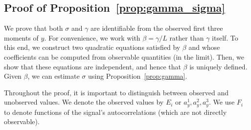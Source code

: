 \documentclass[12pt]{article}
\newcommand{\1}{\mathbf{1}}
\theoremstyle{plain}
\theoremstyle{definition}
\theoremstyle{remark}
\theoremstyle{plain}
\theoremstyle{remark}
\theoremstyle{plain}
\theoremstyle{plain}
\theoremstyle{plain}
\numberwithin{equation}{section}
\begin{document}
\subsection{Proof of Proposition~\ref{prop:gamma_sigma}} \label{sec:proof_prop_gamma_sigma}

We prove that both $\sigma$ and $\gamma$ are identifiable from the observed first three moments of $y$. For convenience, we work with $\beta = \gamma / L$ rather than $\gamma$ itself. To this end, we construct two quadratic equations satisfied by $\beta$ and whose coefficients can be computed from observable quantities (in the limit). Then, we show that these equations are independent, and hence that $\beta$ is uniquely defined. Given $\beta$, we can estimate $\sigma$ using Proposition~\ref{prop:gamma}.

Throughout the proof, it is important to distinguish between observed and unobserved values.
We denote the observed values by $E_i$ or $a_y^1,a_y^2,a_y^3$. We use $F_i$ to denote functions of the signal's autocorrelations (which are not directly observable).
\end{document}
